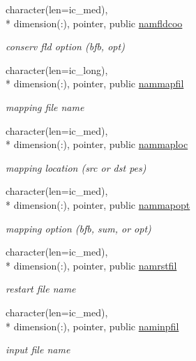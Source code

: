 \begin{DoxyCompactItemize}
character(len=ic\+\_\+med), \\*
dimension(\+:), pointer, public \hyperlink{classmod__oasis__namcouple_a119b86702766d5392cb44856448bcd3e}{namfldcoo}
\begin{DoxyCompactList}\small\item\em conserv fld option (bfb, opt) \end{DoxyCompactList}\item 
character(len=ic\+\_\+long), \\*
dimension(\+:), pointer, public \hyperlink{classmod__oasis__namcouple_a9fc6ac674a8cfa68d9d15ad13213e21d}{nammapfil}
\begin{DoxyCompactList}\small\item\em mapping file name \end{DoxyCompactList}\item 
character(len=ic\+\_\+med), \\*
dimension(\+:), pointer, public \hyperlink{classmod__oasis__namcouple_a7316d7d322da7cf10f315e38c145ebbb}{nammaploc}
\begin{DoxyCompactList}\small\item\em mapping location (src or dst pes) \end{DoxyCompactList}\item 
character(len=ic\+\_\+med), \\*
dimension(\+:), pointer, public \hyperlink{classmod__oasis__namcouple_ad2554b4881fa63780dd5e6fe78d705ef}{nammapopt}
\begin{DoxyCompactList}\small\item\em mapping option (bfb, sum, or opt) \end{DoxyCompactList}\item 
character(len=ic\+\_\+med), \\*
dimension(\+:), pointer, public \hyperlink{classmod__oasis__namcouple_a54f4b8262f809a20928092782bc78345}{namrstfil}
\begin{DoxyCompactList}\small\item\em restart file name \end{DoxyCompactList}\item 
character(len=ic\+\_\+med), \\*
dimension(\+:), pointer, public \hyperlink{classmod__oasis__namcouple_a15fc11ff1c1d5718ff127a06a205a82c}{naminpfil}
\begin{DoxyCompactList}\small\item\em input file name \end{DoxyCompactList}\item 

\end{DoxyCompactItemize}
